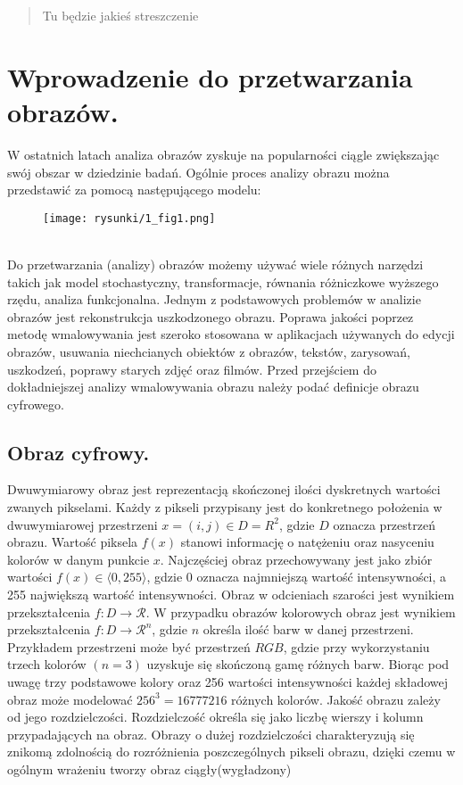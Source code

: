 \documentclass[12pt, twoside, openany]{report}
\theoremstyle{definition}
\begin{document}
\begin{abstract}
Tu będzie jakieś streszczenie
\end{abstract}

\newpage
\printunsrtglossary[type=symbols, style=long, title={Wykaz oznaczeń i symboli}]
    

\chapter{Wprowadzenie do przetwarzania obrazów.}
W ostatnich latach analiza obrazów zyskuje na popularności ciągle zwiększając swój obszar w dziedzinie badań. Ogólnie proces analizy obrazu można przedstawić za pomocą następującego modelu: \\
\begin{figure}[!h]
	\centering
	\texttt{[image: rysunki/1\_fig1.png]}
\end{figure}
\\
Do przetwarzania (analizy) obrazów możemy używać wiele różnych narzędzi takich jak model stochastyczny, transformacje, równania różniczkowe wyższego rzędu, analiza funkcjonalna. Jednym z podstawowych problemów w analizie obrazów jest rekonstrukcja uszkodzonego obrazu. Poprawa jakości poprzez metodę wmalowywania jest szeroko stosowana w aplikacjach używanych do edycji obrazów, usuwania niechcianych obiektów z obrazów, tekstów, zarysowań, uszkodzeń, poprawy starych zdjęć oraz filmów. Przed przejściem do dokładniejszej analizy wmalowywania obrazu należy podać definicje obrazu cyfrowego.
\section{Obraz cyfrowy.}
Dwuwymiarowy obraz jest reprezentacją skończonej ilości dyskretnych wartości zwanych pikselami. Każdy z pikseli przypisany jest do konkretnego położenia w dwuwymiarowej przestrzeni $x = (i,j) \in D=R^2$, gdzie $D$ oznacza przestrzeń obrazu. Wartość piksela $f(x)$ stanowi informację o natężeniu oraz nasyceniu kolorów w danym punkcie $x$. Najczęściej obraz przechowywany jest jako zbiór wartości $f(x) \in \langle 0,255 \rangle$, gdzie 0 oznacza najmniejszą wartość intensywności, a 255 największą wartość intensywności. Obraz w odcieniach szarości jest wynikiem przekształcenia $f: D \rightarrow \mathcal{R}$. W przypadku obrazów kolorowych obraz jest wynikiem przekształcenia $f: D \rightarrow \mathcal{R}^n$, gdzie $n$ określa ilość barw w danej przestrzeni. Przykładem przestrzeni może być przestrzeń $RGB$, gdzie przy wykorzystaniu trzech kolorów $(n=3)$ uzyskuje się skończoną gamę różnych barw. Biorąc pod uwagę trzy podstawowe kolory oraz 256 wartości intensywności każdej składowej obraz może modelować $256^3=16777216$ różnych kolorów. Jakość obrazu zależy od jego rozdzielczości. Rozdzielczość określa się jako liczbę wierszy i kolumn przypadających na obraz. Obrazy o dużej rozdzielczości charakteryzują się znikomą zdolnością do rozróżnienia poszczególnych pikseli obrazu, dzięki czemu w ogólnym wrażeniu tworzy obraz ciągły(wygładzony)
\end{document}
